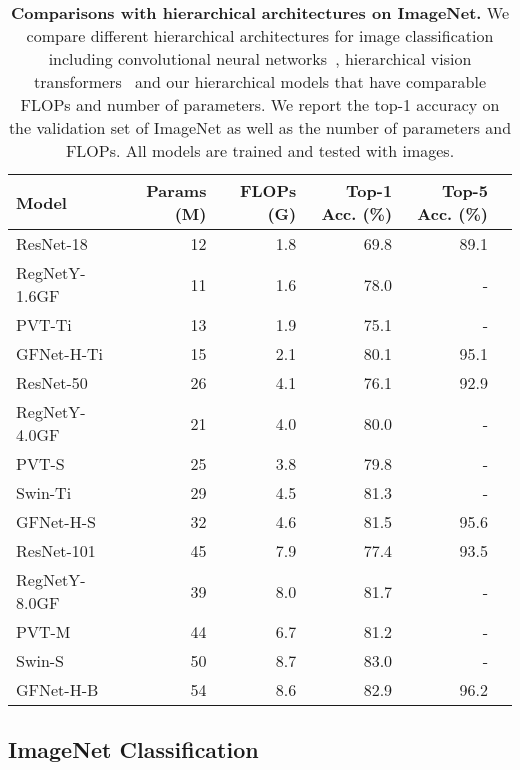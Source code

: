 \documentclass{article}
\numberwithin{equation}{section}
\begin{document}
\begin{table}[t]
  \centering
\caption{\textbf{Comparisons with hierarchical architectures on ImageNet.} We compare different hierarchical architectures for image classification including convolutional neural networks~\cite{he2016deep,regnet}, hierarchical vision transformers~\cite{wang2021pyramid,liu2021swin} and our hierarchical models that have comparable FLOPs and number of parameters. We report the top-1 accuracy on the validation set of ImageNet as well as the number of parameters and FLOPs. All models are trained and tested with  images.} \vspace{5pt}
    \begin{tabular}{lrrrrr}\toprule
    Model & Params (M) & FLOPs (G)  & Top-1 Acc. (\%) & Top-5  Acc.  (\%) \\ \midrule
     ResNet-18~\cite{he2016deep} & 12    & 1.8    &  69.8 & 89.1  \\
     RegNetY-1.6GF~\cite{regnet} & 11    & 1.6      & 78.0  & - \\
     PVT-Ti~\cite{liu2021pay} & 13     & 1.9     & 75.1  & - \\
     \rowcolor{Gray} GFNet-H-Ti & 15 & 2.1 & 80.1 & 95.1 \\ \midrule
     ResNet-50~\cite{touvron2020deit} & 26    & 4.1    &  76.1 & 92.9  \\
     RegNetY-4.0GF~\cite{regnet} &  21    & 4.0     & 80.0  & -\\
     PVT-S~\cite{liu2021pay} & 25    & 3.8    & 79.8 & - \\
     Swin-Ti~\cite{liu2021swin} & 29 & 4.5 & 81.3 & - \\
     \rowcolor{Gray} GFNet-H-S & 32 & 4.6  &  81.5 & 95.6\\ \midrule
     ResNet-101~\cite{touvron2020deit} & 45    & 7.9      &   77.4& 93.5   \\
     RegNetY-8.0GF~\cite{regnet} & 39    & 8.0     & 81.7  & - \\
     PVT-M~\cite{liu2021pay} & 44    & 6.7     & 81.2  & - \\
     Swin-S~\cite{liu2021swin} & 50 & 8.7 & 83.0 & -\\
     \rowcolor{Gray} GFNet-H-B & 54 &  8.6 & 82.9 & 96.2 \\ \bottomrule
    \end{tabular}\label{tab:main2} \vspace{-7pt}
\end{table}

\subsection{ImageNet Classification}
\end{document}
